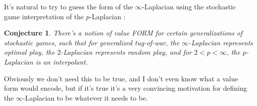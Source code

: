 \documentclass[reqno,10pt]{amsart}
\newtheorem{conjecture}[theorem]{Conjecture}
\theoremstyle{definition}
\numberwithin{equation}{section}
\begin{document}
It's natural to try to guess the form of the $\infty$-Laplacian using the stochastic game interpretation of the $p$-Laplacian \cite{Peres08}:

\begin{conjecture}
There's a notion of value FORM for certain generalizations of stochastic games, such that for generalized tug-of-war, the $\infty$-Laplacian represents optimal play, the $2$-Laplacian represents random play, and for $2 < p < \infty$, the $p$-Laplacian is an interpolant.
\end{conjecture}

Obviously we don't need this to be true, and I don't even know what a value form would encode, but if it's true it's a very convincing motivation for defining the $\infty$-Laplacian to be whatever it needs to be.


\printbibliography
\end{document}
